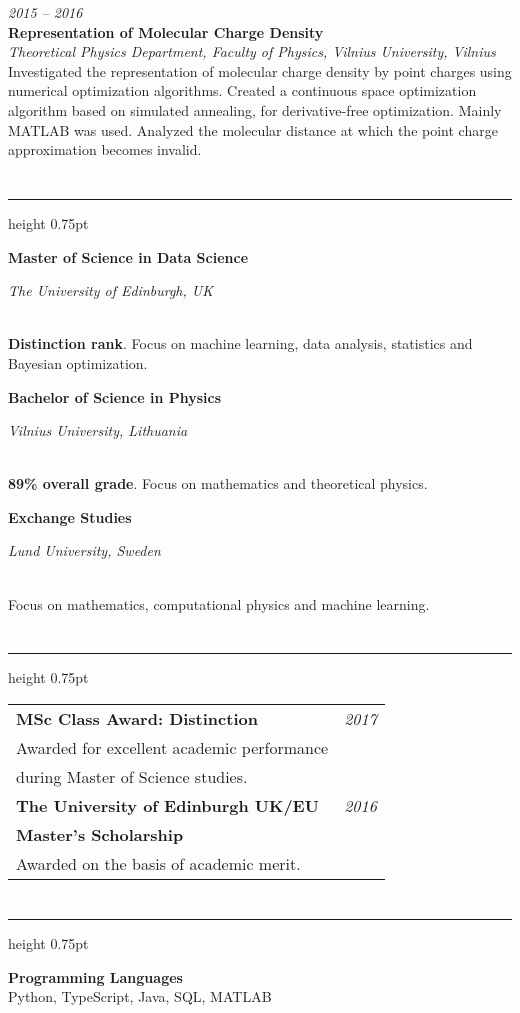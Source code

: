 \documentclass[fontsize=10pt]{article}
\let\oldsection\section
\renewcommand\section[1]{%
	\vspace{-0.5\baselineskip}
    \oldsection{\color{Brown}{#1}}%
	\vspace{-0.5\baselineskip}
    \hrule height 0.75pt
    \vspace{0.75\baselineskip}
}
\newcommand\position[3]{
	{\raggedleft\textit{#1}\\[2.5pt]}%
	{\large\textbf{#2}}\\[2.5pt]%
	\textit{#3}\\[5pt]%
}
\newcommand\education[3]{
	{\large\textbf{#1}}\\%
	{\raggedright\textit{#2}}%
	{\hspace*{\fill}{\textit{#3}}}\\[5pt]%
}
\begin{document}
\position{2015 -- 2016}{Representation of Molecular Charge Density}{Theoretical Physics Department, Faculty of Physics, Vilnius University, Vilnius}
Investigated the representation of molecular charge density by point charges using numerical optimization algorithms. Created 
a continuous space optimization algorithm based on simulated annealing, for derivative-free optimization. Mainly MATLAB was 
used. Analyzed the molecular distance at which the point charge approximation becomes invalid.

\newpage
\section{Education}

\education{Master of Science in Data Science}{The University of Edinburgh, UK}{2016 -- 2017}
\textbf{Distinction rank}. Focus on machine learning, data analysis, statistics and Bayesian optimization.

\vspace{\baselineskip}

\education{Bachelor of Science in Physics}{Vilnius University, Lithuania}{2012 -- 2016}
\textbf{89\% overall grade}. Focus on mathematics and theoretical physics.

\vspace{\baselineskip}

\education{Exchange Studies}{Lund University, Sweden}{2015 -- 2016}
Focus on mathematics, computational physics and machine learning.

\section{Academic Awards}
\begin{tabular}{ll}
	\textbf{MSc Class Award: Distinction} & \textit{2017}\\
	 Awarded for excellent academic performance\\
	 during Master of Science studies.\\[5pt]
	\textbf{The University of Edinburgh UK/EU} & \textit{2016}\\ 
	\textbf{Master's Scholarship}\\
	Awarded on the basis of academic merit.
\end{tabular}


\section{Technical Skills}
\textbf{Programming Languages}\\
Python, TypeScript, Java, SQL, MATLAB
\vspace{0.25\baselineskip}
\end{document}
